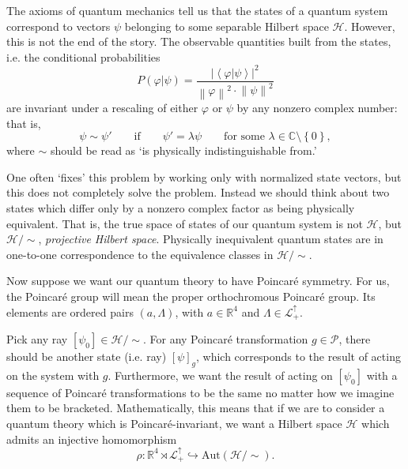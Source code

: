 \documentclass[a4paper,10pt]{scrreprt}
\newcommand{\R}{\mathbb{R}}
\newcommand{\C}{\mathbb{C}}
\newcommand{\norm}[1]{\left\lVert#1\right\rVert}
\theoremstyle{definition}
\theoremstyle{plain}
\theoremstyle{remark}
\begin{document}
The axioms of quantum mechanics tell us that the states of a quantum system correspond to vectors $\psi$ belonging to some separable Hilbert space $\mathscr{H}$. However, this is not the end of the story. The observable quantities built from the states, i.e. the conditional probabilities
\begin{equation*}
  P(\varphi | \psi) = \frac{\left|\left\langle \varphi | \psi \right\rangle\right|^{2}}{\norm{\varphi}^{2} \cdot \norm{\psi}^{2}}
\end{equation*}
are invariant under a rescaling of either $\varphi$ or $\psi$ by any nonzero complex number: that is,
\begin{equation*}
  \psi \sim \psi' \qquad\text{if}\qquad \psi' = \lambda \psi\qquad\text{for some }\lambda \in \C\setminus\left\{ 0 \right\},
\end{equation*}
where $\sim$ should be read as `is physically indistinguishable from.'

One often `fixes' this problem by working only with normalized state vectors, but this does not completely solve the problem. Instead we should think about two states which differ only by a nonzero complex factor as being physically equivalent. That is, the true space of states of our quantum system is not $\mathscr{H}$, but $\mathscr{H} / \sim$, \emph{projective Hilbert space}. Physically inequivalent quantum states are in one-to-one correspondence to the equivalence classes in $\mathscr{H}/\sim$.

Now suppose we want our quantum theory to have Poincar{\'e} symmetry. For us, the Poincar{\'e} group will mean the proper orthochromous Poincar{\'e} group. Its elements are ordered pairs $(a, \Lambda)$, with $a \in \R^{4}$ and $\Lambda \in \mathcal{L}^{\uparrow}_{+}$.

Pick any ray $[\psi_{0}] \in \mathscr{H}/\sim$. For any Poincar{\'e} transformation $g \in \mathcal{P}$, there should be another state (i.e. ray) $[\psi]_{g}$, which corresponds to the result of acting on the system with $g$. Furthermore, we want the result of acting on $[\psi_{0}]$ with a sequence of Poincar{\'e} transformations to be the same no matter how we imagine them to be bracketed. Mathematically, this means that if we are to consider a quantum theory which is Poincar{\'e}-invariant, we want a Hilbert space $\mathscr{H}$ which admits an injective homomorphism
\begin{equation*}
  \rho\colon \R^{4} \rtimes \mathcal{L}^{\uparrow}_{+} \hookrightarrow \mathrm{Aut}(\mathscr{H}/\sim).
\end{equation*}
\end{document}
